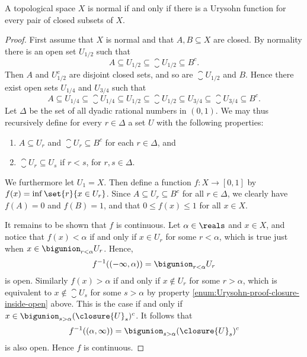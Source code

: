 \documentclass[article, a4paper, 11pt, oneside]{memoir}
\numberwithin{equation}{chapter}
\newcommand{\preim}{^{-1}}
\begin{document}
\begin{theorem}
    A topological space $X$ is normal if and only if there is a Urysohn function for every pair of closed subsets of $X$.
\end{theorem}

\begin{proof}
    First assume that $X$ is normal and that $A,B \subseteq X$ are closed. By normality there is an open set $U_{1/2}$ such that
    \begin{equation*}
        A
            \subseteq U_{1/2}
            \subseteq \closure{U}_{\!1/2}
            \subseteq B^c.
    \end{equation*}
    Then $A$ and $U_{1/2}^c$ are disjoint closed sets, and so are $\closure{U}_{\!1/2}$ and $B$. Hence there exist open sets $U_{1/4}$ and $U_{3/4}$ such that
    \begin{equation*}
        A
            \subseteq U_{1/4}
            \subseteq \closure{U}_{\!1/4}
            \subseteq U_{1/2}
            \subseteq \closure{U}_{\!1/2}
            \subseteq U_{3/4}
            \subseteq \closure{U}_{\!3/4}
            \subseteq B^c.
    \end{equation*}
    Let $\Delta$ be the set of all dyadic rational numbers in $(0,1)$. We may thus recursively define for every $r \in \Delta$ a set $U$ with the following properties:
    \begin{enumerate} %
        \item $A \subseteq U_r$ and $\closure{U}_r \subseteq B^c$ for each $r \in \Delta$, and

        \item \label{enum:Urysohn-proof-closure-inside-open} $\closure{U}_r \subseteq U_s$ if $r < s$, for $r,s \in \Delta$.
    \end{enumerate}
    We furthermore let $U_1 = X$. Then define a function $f \colon X \to [0,1]$ by $f(x) = \inf \set{r}{x \in U_r}$. Since $A \subseteq U_r \subseteq B^c$ for all $r \in \Delta$, we clearly have $f(A) = 0$ and $f(B) = 1$, and that $0 \leq f(x) \leq 1$ for all $x \in X$.

    It remains to be shown that $f$ is continuous. Let $\alpha \in \reals$ and $x \in X$, and notice that $f(x) < \alpha$ if and only if $x \in U_r$ for some $r < \alpha$, which is true just when $x \in \bigunion_{r < \alpha} U_r$. Hence,
    \begin{equation*}
        f\preim((-\infty,\alpha))
            = \bigunion_{r < \alpha} U_r
    \end{equation*}
    is open. Similarly $f(x) > \alpha$ if and only if $x \not\in U_r$ for some $r > \alpha$, which is equivalent to $x \not\in \closure{U}_s$ for some $s > \alpha$ by property \cref{enum:Urysohn-proof-closure-inside-open} above. This is the case if and only if $x \in \bigunion_{s > \alpha} (\closure{U}_s)^c$. It follows that
    \begin{equation*}
        f\preim((\alpha,\infty))
            = \bigunion_{s > \alpha} (\closure{U}_s)^c
    \end{equation*}
    is also open. Hence $f$ is continuous.


\end{proof}
\end{document}
